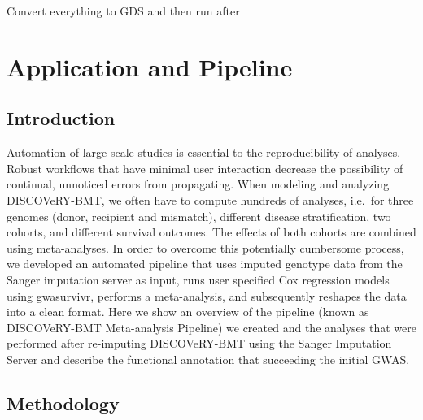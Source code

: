 \documentclass[]{DissertateOSU}
\begin{document}
Convert everything to GDS and then run after

\FloatBarrier

\newpage

\pagestyle{plain} \fancyhead[L]{} \fancyhead[R]{}
\fancyfoot[C]{\thepage} \chapter{Application and Pipeline}
\doublespacing

\section{Introduction}\label{introduction-3}

Automation of large scale studies is essential to the reproducibility of
analyses. Robust workflows that have minimal user interaction decrease
the possibility of continual, unnoticed errors from propagating. When
modeling and analyzing DISCOVeRY-BMT, we often have to compute hundreds
of analyses, i.e.~for three genomes (donor, recipient and mismatch),
different disease stratification, two cohorts, and different survival
outcomes. The effects of both cohorts are combined using meta-analyses.
In order to overcome this potentially cumbersome process, we developed
an automated pipeline that uses imputed genotype data from the Sanger
imputation server as input, runs user specified Cox regression models
using gwasurvivr, performs a meta-analysis, and subsequently reshapes
the data into a clean format. Here we show an overview of the pipeline
(known as DISCOVeRY-BMT Meta-analysis Pipeline) we created and the
analyses that were performed after re-imputing DISCOVeRY-BMT using the
Sanger Imputation Server and describe the functional annotation that
succeeding the initial GWAS.

\section{Methodology}\label{methodology}
\end{document}
